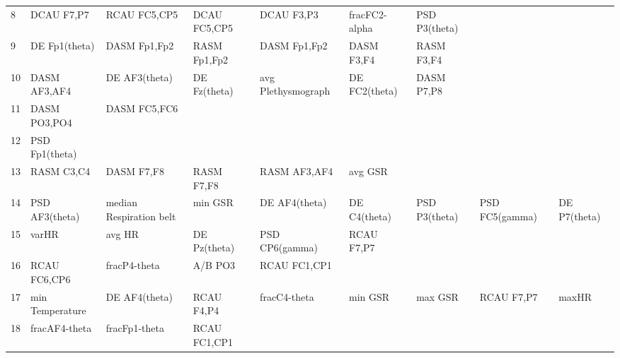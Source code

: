 \begin{landscape}
\begin{table}[]
\begin{tabular}{l|llllllll}
8                  & DCAU F7,P7           & RCAU FC5,CP5            & DCAU FC5,CP5         & DCAU F3,P3         & fracFC2-alpha         & PSD P3(theta)        &                 &                 \\
9                  & DE Fp1(theta)        & DASM Fp1,Fp2            & RASM Fp1,Fp2         & DASM Fp1,Fp2       & DASM F3,F4            & RASM F3,F4           &                 &                 \\
10                 & DASM AF3,AF4         & DE AF3(theta)           & DE Fz(theta)         & avg Plethysmograph & DE FC2(theta)         & DASM P7,P8           &                 &                 \\
11                 & DASM PO3,PO4         & DASM FC5,FC6            &                      &                    &                       &                      &                 &                 \\
12                 & PSD Fp1(theta)       &                         &                      &                    &                       &                      &                 &                 \\
13                 & RASM C3,C4           & DASM F7,F8              & RASM F7,F8           & RASM AF3,AF4       & avg GSR               &                      &                 &                 \\
14                 & PSD AF3(theta)       & median Respiration belt & min GSR              & DE AF4(theta)      & DE C4(theta)          & PSD P3(theta)        & PSD FC5(gamma)  & DE P7(theta)    \\
15                 & varHR                & avg HR                  & DE Pz(theta)         & PSD CP6(gamma)     & RCAU F7,P7            &                      &                 &                 \\
16                 & RCAU FC6,CP6         & fracP4-theta            & A/B PO3              & RCAU FC1,CP1       &                       &                      &                 &                 \\
17                 & min Temperature      & DE AF4(theta)           & RCAU F4,P4           & fracC4-theta       & min GSR               & max GSR              & RCAU F7,P7      & maxHR           \\
18                 & fracAF4-theta        & fracFp1-theta           & RCAU FC1,CP1         &                    &                       &                      &                 &                 \\

\end{tabular}
\end{table}
\end{landscape}

